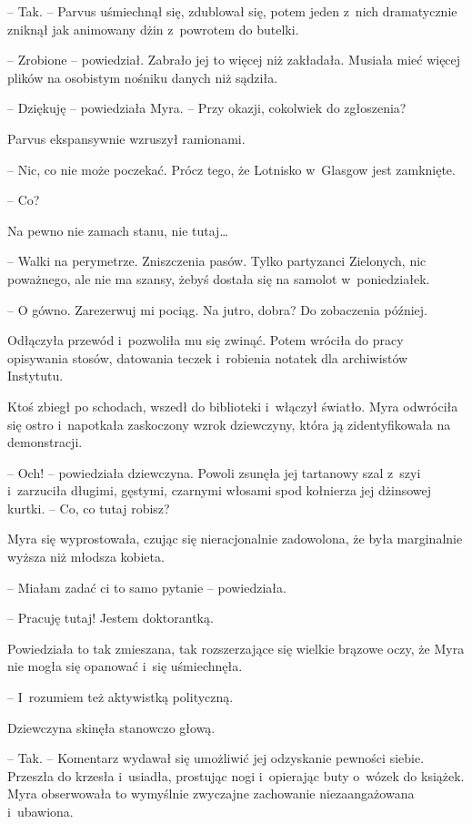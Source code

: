 \documentclass[oneside,polish,11pt,sfheadings]{mwbk}
\begin{document}
-- Tak. -- Parvus uśmiechnął się, zdublował się, potem jeden z~nich
dramatycznie zniknął jak animowany dżin z~powrotem do butelki.

-- Zrobione -- powiedział. Zabrało jej to więcej niż zakładała. Musiała
mieć więcej plików na osobistym nośniku danych niż sądziła.

-- Dziękuję -- powiedziała Myra. -- Przy okazji, cokolwiek do zgłoszenia?

Parvus ekspansywnie wzruszył ramionami. 

-- Nic, co nie może poczekać.
Prócz tego, że Lotnisko w~Glasgow jest zamknięte.

-- Co?

Na pewno nie zamach stanu, nie tutaj\ldots

-- Walki na perymetrze. Zniszczenia pasów. Tylko partyzanci Zielonych,
nic poważnego, ale nie ma szansy, żebyś dostała się na samolot w~poniedziałek.

-- O gówno. Zarezerwuj mi pociąg. Na jutro, dobra? Do zobaczenia później.

Odłączyła przewód i~pozwoliła mu się zwinąć. Potem wróciła do pracy
opisywania stosów, datowania teczek i~robienia notatek dla archiwistów
Instytutu.

Ktoś zbiegł po schodach, wszedł do biblioteki i~włączył światło. Myra
odwróciła się ostro i~napotkała zaskoczony wzrok dziewczyny, która ją
zidentyfikowała na demonstracji.

-- Och! -- powiedziała dziewczyna. Powoli zsunęła jej tartanowy szal z~szyi i~zarzuciła długimi, gęstymi, czarnymi włosami spod kołnierza jej
dżinsowej kurtki. -- Co, co tutaj robisz?

Myra się wyprostowała, czując się nieracjonalnie zadowolona, że była
marginalnie wyższa niż młodsza kobieta.

-- Miałam zadać ci to samo pytanie -- powiedziała.

-- Pracuję tutaj! Jestem doktorantką.

Powiedziała to tak zmieszana, tak rozszerzające się wielkie brązowe
oczy, że Myra nie mogła się opanować i~się uśmiechnęła.

-- I~rozumiem też aktywistką polityczną.

Dziewczyna skinęła stanowczo głową. 

-- Tak. -- Komentarz wydawał się
umożliwić jej odzyskanie pewności siebie. Przeszła do krzesła i~usiadła,
prostując nogi i~opierając buty o~wózek do książek. Myra obserwowała to
wymyślnie zwyczajne zachowanie niezaangażowana i~ubawiona.
\end{document}
